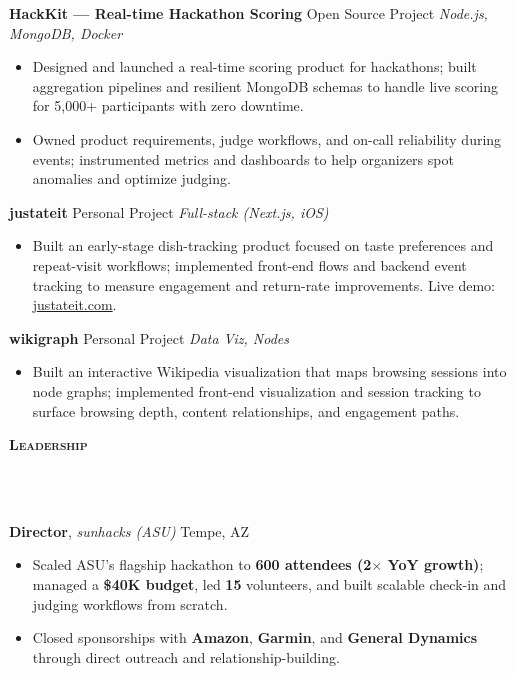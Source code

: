 \documentclass[10pt]{article}
\newcommand{\lineunder} {
    \vspace*{-10pt} \\
    \hspace*{-18pt} \hrulefill \\
    \vspace*{2pt}
}
\newcommand{\header} [1] {
  \vspace*{2pt}
    {\hspace*{-15pt}\textsc{#1}}
    \lineunder
}
\begin{document}
\textbf{HackKit — Real-time Hackathon Scoring} \hfill Open Source Project \textbar{} \textit{Node.js, MongoDB, Docker}\\
\begin{itemize}[leftmargin=5mm, itemsep=0mm]
  \item Designed and launched a real-time scoring product for hackathons; built aggregation pipelines and resilient MongoDB schemas to handle live scoring for 5{,}000+ participants with zero downtime.
  \item Owned product requirements, judge workflows, and on-call reliability during events; instrumented metrics and dashboards to help organizers spot anomalies and optimize judging.
\end{itemize}

\textbf{justateit} \hfill Personal Project \textbar{} \textit{Full-stack (Next.js, iOS)}\\
\begin{itemize}[leftmargin=5mm, itemsep=0mm]
  \item Built an early-stage dish-tracking product focused on taste preferences and repeat-visit workflows; implemented front-end flows and backend event tracking to measure engagement and return-rate improvements. Live demo: \href{https://justateit.com/}{justateit.com}.
\end{itemize}
\textbf{wikigraph} \hfill Personal Project \textbar{} \textit{Data Viz, Nodes}\\
\begin{itemize}[leftmargin=5mm, itemsep=0mm]
  \item Built an interactive Wikipedia visualization that maps browsing sessions into node graphs; implemented front-end visualization and session tracking to surface browsing depth, content relationships, and engagement paths.
\end{itemize}

\header{\textbf{Leadership}}

\textbf{Director}, \textit{sunhacks (ASU)} \hfill Tempe, AZ\\
\begin{itemize}[leftmargin=5mm, itemsep=0mm]
  \item Scaled ASU's flagship hackathon to \textbf{600 attendees (2$\times$ YoY growth)}; managed a \textbf{\$40K budget}, led \textbf{15} volunteers, and built scalable check-in and judging workflows from scratch.
  \item Closed sponsorships with \textbf{Amazon}, \textbf{Garmin}, and \textbf{General Dynamics} through direct outreach and relationship-building.
\end{itemize}
\end{document}
